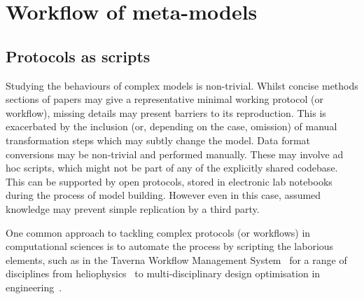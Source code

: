 \documentclass[conference]{IEEEtran}
\begin{document}
\section{Workflow of meta-models}

\subsection{Protocols as scripts}

Studying the behaviours of complex models is non-trivial. Whilst
concise methods sections of papers may give a representative minimal
working protocol (or workflow), missing details may present barriers
to its reproduction. This is exacerbated by the inclusion (or,
depending on the case, omission) of manual transformation steps which
may subtly change the model. Data format conversions may be
non-trivial and performed manually. These may involve ad hoc scripts,
which might not be part of any of the explicitly shared codebase. This
can be supported by open protocols, stored in electronic lab notebooks
during the process of model building. However even in this case,
assumed knowledge may prevent simple replication by a third party.

One common approach to tackling complex protocols (or workflows) in
computational sciences is to automate the process by scripting the
laborious elements, such as in the Taverna Workflow Management
System~\cite{taverna:2013} for a range of disciplines from
heliophysics~\cite{leblanc-et-al:2013} to multi-disciplinary design
optimisation in engineering~\cite{crick-et-al:2009}.
\end{document}
